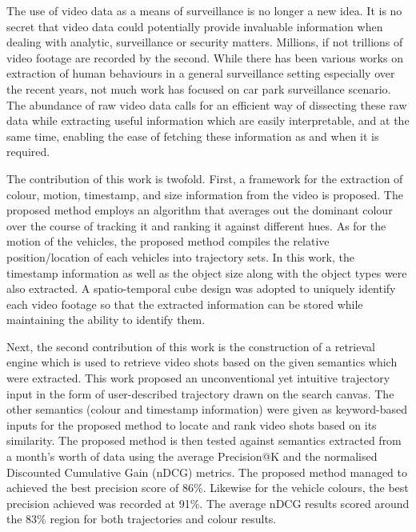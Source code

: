 
The use of video data as a means of surveillance is no longer a new idea. It is no secret that video data could potentially provide invaluable information when dealing with analytic, surveillance or security matters. Millions, if not trillions of video footage are recorded by the second. While there has been various works on extraction of human behaviours in a general surveillance setting especially over the recent years, not much work has focused on car park surveillance scenario. The abundance of raw video data calls for an efficient way of dissecting these raw data while extracting useful information which are easily interpretable, and at the same time, enabling the ease of fetching these information as and when it is required. 

The contribution of this work is twofold. First, a framework for the extraction of colour, motion, timestamp, and size information from the video is proposed. 
The proposed method employs an algorithm that averages out the dominant colour over the course of tracking it and ranking it against different hues. 
As for the motion of the vehicles, the proposed method compiles the relative position/location of each vehicles into trajectory sets. In this work, the timestamp information as well as the object size along with the object types were also extracted. A spatio-temporal cube design was adopted to uniquely identify each video footage so that the extracted information can be stored while maintaining the ability to identify them.  

Next, the second contribution of this work is the construction of a retrieval engine which is used to retrieve video shots based on the given semantics which were extracted. This work proposed an unconventional yet intuitive trajectory input in the form of user-described trajectory drawn on the search canvas. 
The other semantics (colour and timestamp information) were given as keyword-based inputs for the proposed method to locate and rank video shots based on its similarity. 
The proposed method is then tested against semantics extracted from a month's worth of data 
using the average Precision@K and the normalised Discounted Cumulative Gain (nDCG) metrics. The proposed method managed to achieved the best precision score of 86\%. Likewise for the vehicle colours, the best precision achieved was recorded at 91\%. The average nDCG results scored around the 83\% region for both trajectories and colour results. 

